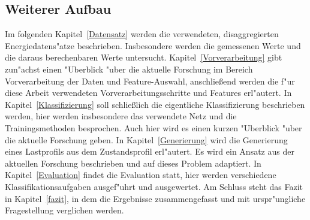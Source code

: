 \subsection{Weiterer Aufbau}
\label{Weiterer Aufbau}
	Im folgenden Kapitel~\ref{Datensatz} werden die verwendeten, disaggregierten Energiedatens"atze beschrieben. Insbesondere werden die gemessenen Werte und die daraus berechenbaren Werte untersucht. 
	Kapitel~\ref{Vorverarbeitung} gibt zun"achst einen "Uberblick "uber die aktuelle Forschung im Bereich Vorverarbeitung der Daten und Feature-Auswahl, anschlie{\ss}end werden die f"ur diese Arbeit verwendeten Vorverarbeitungsschritte und Features erl"autert.
	In Kapitel~\ref{Klassifizierung} soll schlie{\ss}lich die eigentliche Klassifizierung beschrieben werden, hier werden insbesondere das verwendete Netz und die Trainingsmethoden besprochen. Auch hier wird es einen kurzen "Uberblick "uber die aktuelle Forschung geben.
	In Kapitel~\ref{Generierung} wird die Generierung eines Lastprofils aus dem Zustandsprofil erl"autert. Es wird ein Ansatz aus der aktuellen Forschung beschrieben und auf dieses Problem adaptiert. 
	In Kapitel~\ref{Evaluation} findet die Evaluation statt, hier werden verschiedene Klassifikationsaufgaben ausgef"uhrt und ausgewertet. 
	Am Schluss steht das Fazit in Kapitel~\ref{fazit}, in dem die Ergebnisse zusammengefasst und mit urspr"ungliche Fragestellung verglichen werden. 